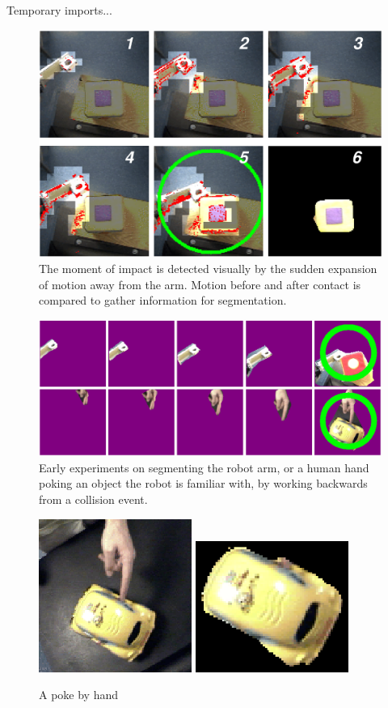 
\ifverbose
Temporary imports...

\begin{figure}[tbh]
  \begin{center}
    \includegraphics[width=12cm]{collision-detail}
  \end{center}
  \caption{
    The moment of impact is detected visually by the
    sudden expansion of motion away from the arm.  Motion before and
    after contact is compared to gather information for segmentation.
}
\end{figure}

\begin{figure}[tbh]
  \centerline{\includegraphics[width=12cm]{manipulator-segment}}
  \caption{Early experiments on segmenting the robot arm, or a 
human hand poking an object the robot is familiar with, by working
backwards from a collision event.}
  \label{fig:manipulator}
\end{figure}

\begin{figure}[tbh]
  \centerline{
\includegraphics[width=5cm]{fig-car-hand-seg-src}
\hspace{1cm}
\includegraphics[width=5cm]{fig-car-hand-seg}
}
  \caption{A poke by hand}
  \label{fig:handpoke}
\end{figure}
\fi
